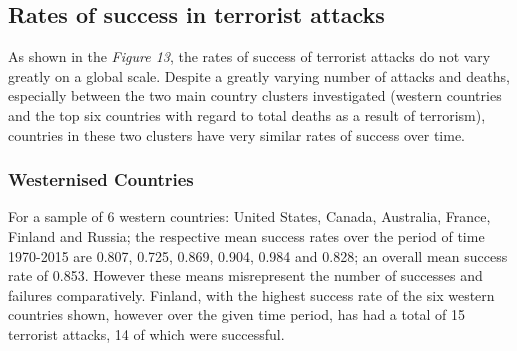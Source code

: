 \documentclass[10pt,a4paper]{article}
\begin{document}
\subsection{Rates of success in terrorist attacks}
As shown in the \textit{Figure 13}, the rates of success of terrorist attacks do not vary greatly on a global scale. Despite a greatly varying number of attacks and deaths, especially between the two main country clusters investigated (western countries and the top six countries with regard to total deaths as a result of terrorism), countries in these two clusters have very similar rates of success over time. 


\subsubsection{Westernised Countries}
For a sample of 6 western countries: United States, Canada, Australia, France, Finland and Russia; the respective mean success rates over the period of time 1970-2015 are 0.807, 0.725, 0.869, 0.904, 0.984 and 0.828; an overall mean success rate of 0.853. However these means misrepresent the number of successes and failures comparatively. Finland, with the highest success rate of the six western countries shown, however over the given time period, has had a total of 15 terrorist attacks, 14 of which were successful. 
\end{document}
